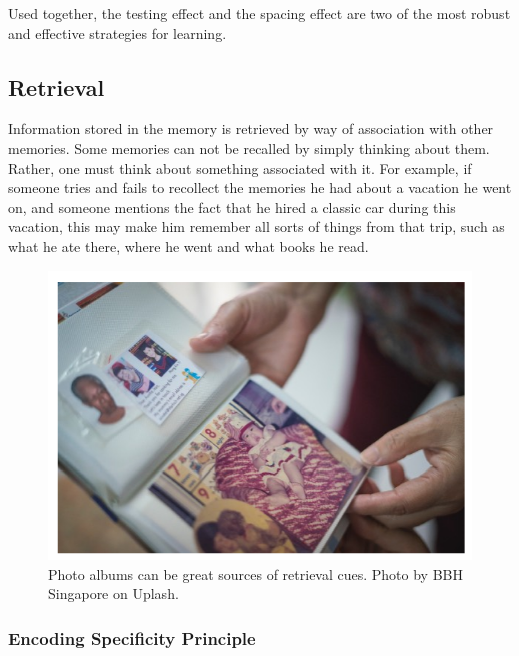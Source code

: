 \documentclass[
]{krantz}
\begin{document}
Used together, the testing effect and the spacing effect are two of the most robust and effective strategies for learning.

\hypertarget{retrieval}{%
\subsection*{Retrieval}\label{retrieval}}


Information stored in the memory is retrieved by way of association with other memories. Some memories can not be recalled by simply thinking about them. Rather, one must think about something associated with it. For example, if someone tries and fails to recollect the memories he had about a vacation he went on, and someone mentions the fact that he hired a classic car during this vacation, this may make him remember all sorts of things from that trip, such as what he ate there, where he went and what books he read.

\begin{figure}

{\centering \includegraphics[width=0.6\linewidth]{images/ch5/fig5} 

}

\caption{Photo albums can be great sources of retrieval cues. Photo by BBH Singapore on Uplash.}\label{fig:albumbs}
\end{figure}

\hypertarget{encoding-specificity-principle}{%
\subsubsection*{Encoding Specificity Principle}\label{encoding-specificity-principle}}
\end{document}
